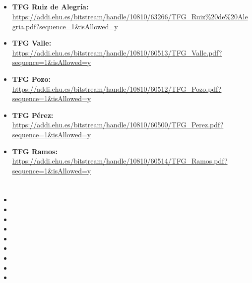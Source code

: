 \subsection{\guideSelected}
\helpSelectedText

\begin{itemize}
    \item \textbf{TFG Ruiz de Alegría:} \url{https://addi.ehu.es/bitstream/handle/10810/63266/TFG_Ruiz%20de%20Alegria.pdf?sequence=1&isAllowed=y}
    \item \textbf{TFG Valle:} \url{https://addi.ehu.es/bitstream/handle/10810/60513/TFG_Valle.pdf?sequence=1&isAllowed=y}
    \item \textbf{TFG Pozo:} \url{https://addi.ehu.es/bitstream/handle/10810/60512/TFG_Pozo.pdf?sequence=1&isAllowed=y}
    \item \textbf{TFG Pérez:} \url{https://addi.ehu.es/bitstream/handle/10810/60500/TFG_Perez.pdf?sequence=1&isAllowed=y}
    \item \textbf{TFG Ramos:} \url{https://addi.ehu.es/bitstream/handle/10810/60514/TFG_Ramos.pdf?sequence=1&isAllowed=y}
\end{itemize}

\section{\gdChecklistTitle}
\label{sec:checklist}

\gdChecklistIntro

\begin{itemize}
    \item[$\square$] \gdCheckGuide
    \item[$\square$] \gdCheckData
    \item[$\square$] \gdCheckHelp
    \item[$\square$] \gdCheckExamples
    \item[$\square$] \gdCheckAbstract
    \item[$\square$] \gdCheckRefs
    \item[$\square$] \gdCheckBib
    \item[$\square$] \gdCheckSpelling
    \item[$\square$] \gdCheckFinal
\end{itemize}
